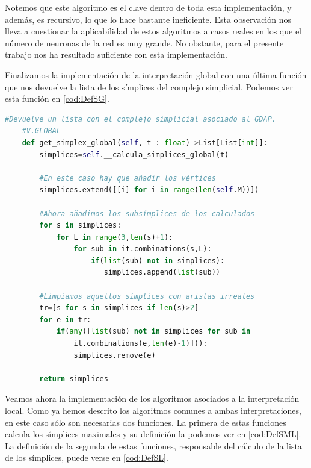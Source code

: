 \documentclass[12pt, a4paper, twoside]{book}
\numberwithin{equation}{section}
\theoremstyle{definition}
\theoremstyle{remark}
\theoremstyle{plain}
\begin{document}
	Notemos que este algoritmo es el clave dentro de toda esta 
	implementación, y además, es recursivo, lo que lo hace bastante 
	ineficiente. Esta observación nos lleva a 
	cuestionar la aplicabilidad de estos algoritmos a casos reales en los 
	que el número de neuronas de la red es muy grande. No obstante, para 
	el presente trabajo nos ha resultado suficiente con esta 
	implementación.

	Finalizamos la implementación de la interpretación global con una 
	última función que nos devuelve la lista de los símplices del complejo
	simplicial. Podemos ver esta función en \autoref{cod:DefSG}.

	\begin{lstlisting}[language=Python, float=htbp, caption= Función para 
	el cálculo de todos los símplices (global), label=cod:DefSG]
	#Devuelve un lista con el complejo simplicial asociado al GDAP. 
	#V.GLOBAL
	def get_simplex_global(self, t : float)->List[List[int]]:
        simplices=self.__calcula_simplices_global(t)
        
        #En este caso hay que añadir los vértices
        simplices.extend([[i] for i in range(len(self.M))])
        
        #Ahora añadimos los subsímplices de los calculados
        for s in simplices:
            for L in range(3,len(s)+1):
                for sub in it.combinations(s,L):
                    if(list(sub) not in simplices):
                       simplices.append(list(sub))
        
        #Limpiamos aquellos símplices con aristas irreales
        tr=[s for s in simplices if len(s)>2]
        for e in tr:
            if(any([list(sub) not in simplices for sub in 
                it.combinations(e,len(e)-1)])):
                simplices.remove(e)

        return simplices
	\end{lstlisting}

	Veamos ahora la implementación de los algoritmos asociados a la 
	interpretación local. Como ya hemos descrito los algoritmos comunes a 
	ambas interpretaciones, en este caso sólo son necesarias dos 
	funciones. La primera de estas funciones calcula los símplices 
	maximales y su definición la podemos ver en \autoref{cod:DefSML}. La 
	definición de la segunda de estas funciones, responsable del cálculo 
	de la lista de los símplices, puede verse en  \autoref{cod:DefSL}.
\end{document}
